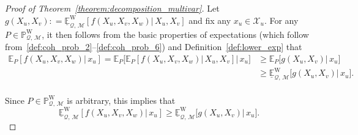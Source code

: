 \documentclass[10pt,a4paper]{paper}
\theoremstyle{definition}
\newcommand{\states}{\mathcal{X}}
\newcommand{\processes}{\mathbb{P}}
\newcommand{\wprocesses}{\processes^{\mathrm{W}}}
\newcommand{\rateset}{\mathcal{Q}}
\newcommand{\coloneqq}{:\!=}
\begin{document}
\begin{proof}[Proof of Theorem~\ref{theorem:decomposition_multivar}]
Let $g(X_u,X_v)\coloneqq\underline{\mathbb{E}}^{\mathrm{W}}_{\rateset,\,\mathcal{M}}\left[f(X_u,X_v,X_w)\vert\,X_u,X_v\right]$ and fix any $x_u\in\states_u$.
For any $P\in\wprocesses_{\rateset,\,\mathcal{M}}$, it then follows from the basic properties of expectations (which follow from~\ref{def:coh_prob_2}--\ref{def:coh_prob_6}) and Definition~\ref{def:lower_exp} that
\begin{align*}
\mathbb{E}_P\left[f(X_u,X_v,X_w)\vert\,x_u\right] = \mathbb{E}_P\bigl[\mathbb{E}_P\left[f(X_u,X_v,X_w)\vert\,X_u,X_v\right]\vert\,x_u\bigr] 
 &\geq \mathbb{E}_P\bigl[g(X_u,X_v)\vert\,x_u\bigr] \\
 &\geq \underline{\mathbb{E}}^{\mathrm{W}}_{\rateset,\,\mathcal{M}}\bigl[g(X_u,X_v)\vert\,x_u\bigr].
\end{align*}\\[-20pt]
Since $P\in\wprocesses_{\rateset,\,\mathcal{M}}$ is arbitrary, this implies that
\begin{equation}\label{eq:theorem:decomposition_multivar:easyinequality}
\underline{\mathbb{E}}^{\mathrm{W}}_{\rateset,\,\mathcal{M}}\left[f(X_u,X_v,X_w)\vert\,x_u\right] \geq \underline{\mathbb{E}}^{\mathrm{W}}_{\rateset,\,\mathcal{M}}\bigl[g(X_u,X_v)\vert\,x_u\bigr].
\end{equation}


\end{proof}
\end{document}
